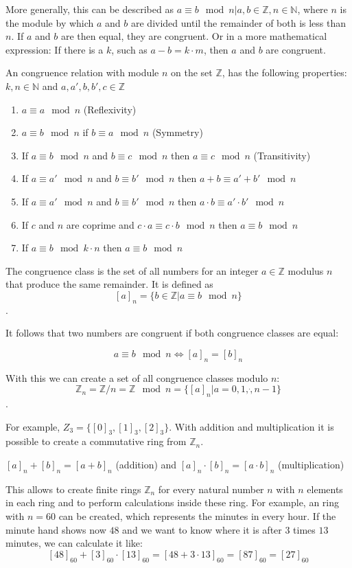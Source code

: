 More generally, this can be described as $a \equiv b \mod n | a,b \in \mathbb{Z}, n \in \mathbb{N}$, where $n$ is the module by which $a$ and $b$ are divided until the remainder of both is less than $n$. If $a$ and $b$ are then equal, they are congruent. Or in a more mathematical expression: If there is a $k$, such as $a-b = k\cdot m$, then $a$ and $b$ are congruent.

An congruence relation with module $n$ on the set $\mathbb{Z}$, has the following properties:
$k,n \in \mathbb{N}$ and $a, a', b, b', c \in \mathbb{Z}$
\begin{enumerate}
  \item $a \equiv a \mod n$ (Reflexivity)
  \item $a \equiv b \mod n$ if $b \equiv a \mod n$ (Symmetry)
  \item If $a \equiv b \mod n$ and $b \equiv c \mod n$ then $a \equiv c \mod n$ (Transitivity)
  \item If $a \equiv a' \mod n$ and $b \equiv b' \mod n$ then $a+b \equiv a'+b' \mod n$
  \item If $a \equiv a' \mod n$ and $b \equiv b' \mod n$ then $a\cdot b \equiv a'\cdot b' \mod n$
  \item If $c$ and $n$ are coprime and $c \cdot a \equiv c \cdot b \mod n$ then $a \equiv b \mod n$
  \item If $a \equiv b \mod k\cdot n$ then $a \equiv b \mod n$
\end{enumerate}

The congruence class is the set of all numbers for an integer $a \in \mathbb{Z}$ modulus $n$ that produce the same remainder. It is defined as
$$[a]_n = \{b \in \mathbb{Z} | a \equiv b \mod n\}$$.

It follows that two numbers are congruent if both congruence classes are equal:

$$a \equiv b \mod n \Leftrightarrow [a]_n = [b]_n$$

With this we can create a set of all congruence classes modulo $n$:
$$\mathbb{Z}_n = \mathbb{Z}/n = \mathbb{Z} \mod n = \{[a]_n | a = 0, 1, \dot, n-1 \}$$.

For example, $Z_3 = \{[0]_3, [1]_3, [2]_3\}$. With addition and multiplication it is possible to create a commutative ring from $\mathbb{Z}_n$.
\begin{center}
    $[a]_n + [b]_n = [a+b]_n$ (addition) and $[a]_n \cdot [b]_n = [a\cdot b]_n$ (multiplication)
\end{center}

This allows to create finite rings $\mathbb{Z}_n$ for every natural number $n$ with $n$ elements in each ring and to perform calculations inside these ring. For example, an ring with $n=60$ can be created, which represents the minutes in every hour. If the minute hand shows now $48$ and we want to know where it is after $3$ times $13$ minutes, we can calculate it like:
$$[48]_{60} + [3]_{60}\cdot [13]_{60} = [48+3\cdot 13]_{60} = [87]_{60} = [27]_{60}$$